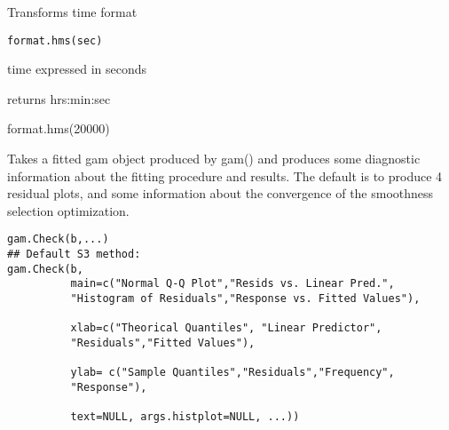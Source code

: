 \documentclass[a4paper]{book}
\begin{document}
\newpage
{}
%
\begin{Description}\relax
Transforms time format
\end{Description}
%
\begin{Usage}
\begin{verbatim}
format.hms(sec)
\end{verbatim}
\end{Usage}
%
\begin{Arguments}
\begin{ldescription}
\item[\code{sec}] time expressed in seconds

\end{ldescription}
\end{Arguments}
%
\begin{Value}
returns hrs:min:sec
\end{Value}
%
\begin{Examples}
\begin{ExampleCode}
format.hms(20000)
\end{ExampleCode}
\end{Examples}
\newpage
{}
%
\begin{Description}\relax
Takes a fitted gam object produced by gam() and produces some diagnostic
information about the fitting procedure and results. The default is to produce
4 residual plots, and some information about the convergence of the smoothness
selection optimization.
\end{Description}
%
\begin{Usage}
\begin{verbatim}
gam.Check(b,...)
## Default S3 method:
gam.Check(b,
          main=c("Normal Q-Q Plot","Resids vs. Linear Pred.",
          "Histogram of Residuals","Response vs. Fitted Values"),

          xlab=c("Theorical Quantiles", "Linear Predictor",
          "Residuals","Fitted Values"),

          ylab= c("Sample Quantiles","Residuals","Frequency",
          "Response"),
          
          text=NULL, args.histplot=NULL, ...))
\end{verbatim}
\end{Usage}
%
\end{document}
